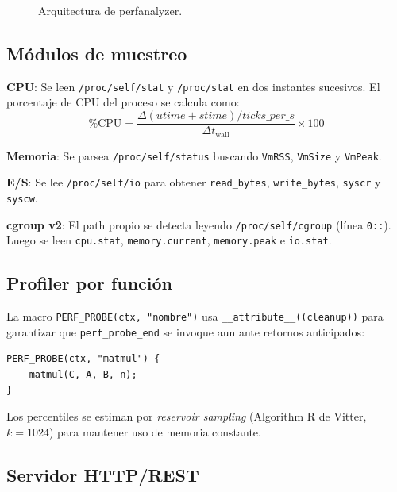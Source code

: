 \documentclass[conference]{IEEEtran}
\begin{document}
\begin{figure}[h]
  \centering
  \caption{Arquitectura de perfanalyzer.}
  \label{fig:arch}
\end{figure}

\subsection{Módulos de muestreo}

\textbf{CPU}: Se leen \texttt{/proc/self/stat} y \texttt{/proc/stat} en dos
instantes sucesivos. El porcentaje de CPU del proceso se calcula como:
\begin{equation}
  \%\mathrm{CPU} = \frac{\Delta(\mathit{utime} + \mathit{stime}) / \mathit{ticks\_per\_s}}
                        {\Delta t_{\mathrm{wall}}} \times 100
\end{equation}

\textbf{Memoria}: Se parsea \texttt{/proc/self/status} buscando
\texttt{VmRSS}, \texttt{VmSize} y \texttt{VmPeak}.

\textbf{E/S}: Se lee \texttt{/proc/self/io} para obtener
\texttt{read\_bytes}, \texttt{write\_bytes}, \texttt{syscr} y \texttt{syscw}.

\textbf{cgroup v2}: El path propio se detecta leyendo \texttt{/proc/self/cgroup}
(línea \texttt{0::}). Luego se leen \texttt{cpu.stat}, \texttt{memory.current},
\texttt{memory.peak} e \texttt{io.stat}.

\subsection{Profiler por función}

La macro \texttt{PERF\_PROBE(ctx, "nombre")} usa
\texttt{\_\_attribute\_\_((cleanup))} para garantizar que \texttt{perf\_probe\_end}
se invoque aun ante retornos anticipados:

\begin{lstlisting}
PERF_PROBE(ctx, "matmul") {
    matmul(C, A, B, n);
}
\end{lstlisting}

Los percentiles se estiman por \textit{reservoir sampling} (Algorithm R de
Vitter, $k = 1024$) para mantener uso de memoria constante.

\subsection{Servidor HTTP/REST}
\end{document}
